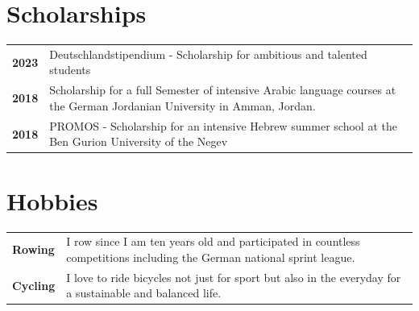 \documentclass{style/modernsimplecv}
\newlength{\rightcolwidth}
\begin{document}
\begin{paracol}{2}
\begin{minipage}[t]{\rightcolwidth}
\begin{minipage}[t]{\rightcolwidth}
        \section*{Scholarships}
        \begin{tabular}{>{\bfseries}p{} >{}p{}}
            2023 & Deutschlandstipendium -  Scholarship for ambitious and talented students                                                  \\
            2018 & Scholarship for a full Semester of intensive Arabic language courses at the German Jordanian University in Amman, Jordan. \\
            2018 & PROMOS -  Scholarship for an intensive Hebrew summer school at the Ben Gurion University of the Negev                     \\
        \end{tabular}
    \end{minipage}\hfill
    \bigskip
    \begin{minipage}[t]{\rightcolwidth}
        \section*{Hobbies}
        \begin{tabular}{>{\bfseries}p{} >{}p{}}
            Rowing  & I row since I am ten years old and participated in countless competitions including the German national sprint league. \\
            Cycling & I love to ride bicycles not just for sport but also in the everyday for a sustainable and balanced life.
        \end{tabular}
    \end{minipage}
\end{minipage}
\end{paracol}
\end{document}
